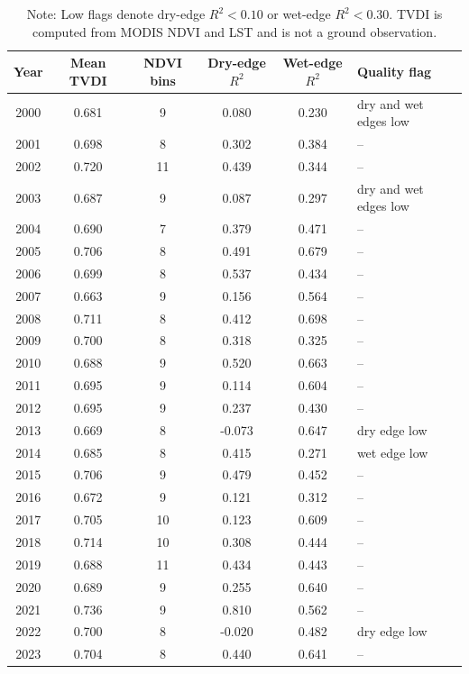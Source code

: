 \documentclass[12pt,a4paper]{article}
\begin{document}
\begin{table}[H]
	\centering
	\caption{Annual lower Heihe (Ejina Oasis) TVDI and edge-fit diagnostics. Low edge fits are retained but flagged as higher uncertainty.}
	\label{tab:s6_ejina_tvdi}
	\footnotesize
	\begin{tabular}{cccccl}
		\toprule
		Year & Mean TVDI & NDVI bins & Dry-edge $R^2$ & Wet-edge $R^2$ & Quality flag \\
		\midrule
		2000 & 0.681 & 9 & 0.080 & 0.230 & dry and wet edges low \\
		2001 & 0.698 & 8 & 0.302 & 0.384 & -- \\
		2002 & 0.720 & 11 & 0.439 & 0.344 & -- \\
		2003 & 0.687 & 9 & 0.087 & 0.297 & dry and wet edges low \\
		2004 & 0.690 & 7 & 0.379 & 0.471 & -- \\
		2005 & 0.706 & 8 & 0.491 & 0.679 & -- \\
		2006 & 0.699 & 8 & 0.537 & 0.434 & -- \\
		2007 & 0.663 & 9 & 0.156 & 0.564 & -- \\
		2008 & 0.711 & 8 & 0.412 & 0.698 & -- \\
		2009 & 0.700 & 8 & 0.318 & 0.325 & -- \\
		2010 & 0.688 & 9 & 0.520 & 0.663 & -- \\
		2011 & 0.695 & 9 & 0.114 & 0.604 & -- \\
		2012 & 0.695 & 9 & 0.237 & 0.430 & -- \\
		2013 & 0.669 & 8 & -0.073 & 0.647 & dry edge low \\
		2014 & 0.685 & 8 & 0.415 & 0.271 & wet edge low \\
		2015 & 0.706 & 9 & 0.479 & 0.452 & -- \\
		2016 & 0.672 & 9 & 0.121 & 0.312 & -- \\
		2017 & 0.705 & 10 & 0.123 & 0.609 & -- \\
		2018 & 0.714 & 10 & 0.308 & 0.444 & -- \\
		2019 & 0.688 & 11 & 0.434 & 0.443 & -- \\
		2020 & 0.689 & 9 & 0.255 & 0.640 & -- \\
		2021 & 0.736 & 9 & 0.810 & 0.562 & -- \\
		2022 & 0.700 & 8 & -0.020 & 0.482 & dry edge low \\
		2023 & 0.704 & 8 & 0.440 & 0.641 & -- \\
		\bottomrule
	\end{tabular}
	\caption*{Note: Low flags denote dry-edge $R^2<0.10$ or wet-edge $R^2<0.30$. TVDI is computed from MODIS NDVI and LST and is not a ground observation.}
\end{table}
\end{document}

